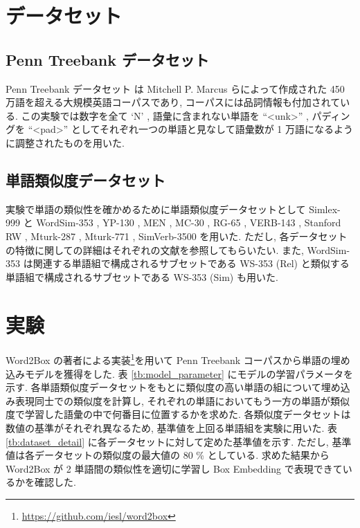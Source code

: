 \documentclass[twocolumn]{jarticle}     %
\begin{document}
\section{データセット}
\subsection{Penn Treebank データセット}
Penn Treebank データセット \cite{ptb} は 	Mitchell P. Marcus らによって作成された 450 万語を超える大規模英語コーパスであり, コーパスには品詞情報も付加されている. 
この実験では数字を全て `N' , 語彙に含まれない単語を ``\textless unk\textgreater'' , パディングを ``\textless pad\textgreater'' としてそれぞれ一つの単語と見なして語彙数が 1 万語になるように調整されたものを用いた.

\subsection{単語類似度データセット}
実験で単語の類似性を確かめるために単語類似度データセットとして Simlex-999 \cite{simlex999} と WordSim-353 \cite{wordsim353}, YP-130 \cite{yp-130}, MEN \cite{men}, MC-30 \cite{mc-30}, RG-65 \cite{rg-65}, VERB-143 \cite{verb-143}, Stanford RW \cite{stanford-rw}, Mturk-287 \cite{mrutk-287}, Mturk-771 \cite{mturk-771}, SimVerb-3500 \cite{gerz-etal-2016-simverb} を用いた. 
ただし, 各データセットの特徴に関しての詳細はそれぞれの文献を参照してもらいたい. 
また, WordSim-353 は関連する単語組で構成されるサブセットである WS-353 (Rel) と類似する単語組で構成されるサブセットである WS-353 (Sim) も用いた. 

\section{実験}
Word2Box の著者による実装\footnote{\url{https://github.com/iesl/word2box}}を用いて Penn Treebank コーパスから単語の埋め込みモデルを獲得をした. 
表 \ref{tb:model_parameter} にモデルの学習パラメータを示す. 
各単語類似度データセットをもとに類似度の高い単語の組について埋め込み表現同士での類似度を計算し, それぞれの単語においてもう一方の単語が類似度で学習した語彙の中で何番目に位置するかを求めた. 
各類似度データセットは数値の基準がそれぞれ異なるため, 基準値を上回る単語組を実験に用いた. 
表 \ref{tb:dataset_detail} に各データセットに対して定めた基準値を示す. 
ただし, 基準値は各データセットの類似度の最大値の 80 \% としている. 
求めた結果から Word2Box が 2 単語間の類似性を適切に学習し Box Embedding で表現できているかを確認した. 
\end{document}
